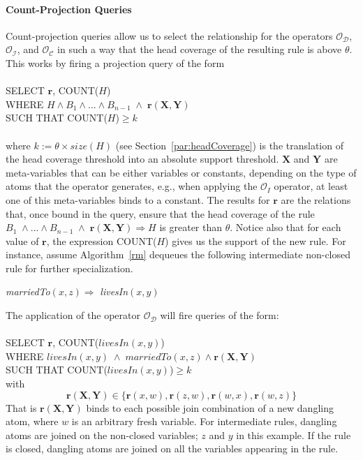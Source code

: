 {\paragraph{Count-Projection Queries} Count-projection queries allow us to select the relationship for the operators 
$\mathcal{O_D}$, $\mathcal{O_I}$, and $\mathcal{O_C}$ in such a way
that the head coverage of the resulting rule is above $\theta$.
This works by firing a projection query of the form
\\ \\
SELECT $\bm{r}$, COUNT($H$)\\
WHERE $H \wedge B_1 \wedge ... \wedge B_{n-1}\; \wedge\; \bm{r}(\bm{X},\bm{Y})$\\
SUCH THAT COUNT($H$)$\geq k$
\\ \\
where $k := \theta \times size(H)$ (see Section~\ref{par:headCoverage}) is the translation of the
head coverage threshold into an absolute support threshold. $\bm{X}$ and $\bm{Y}$ are meta-variables that
can be either variables or constants, 
depending on the type of atoms that the operator generates, e.g., when applying the $\mathcal{O}_I$ operator, 
at least one of this meta-variables binds to a constant.
The results for $\bm{r}$ are the relations that, once bound in the query, ensure that the head coverage 
of the rule $B_1 \; \wedge ... \wedge B_{n-1} \;\wedge\; \bm{r}(\bm{X},\bm{Y}) \Rightarrow H$ is greater than $\theta$.
Notice also that for each value of $\bm{r}$, the expression COUNT($H$) gives us the support of the new rule.
For instance, assume Algorithm~\ref{rm} dequeues the following intermediate non-closed rule for further specialization.

\begin{center}
\emph{marriedTo}$(x,z) \Rightarrow $ \emph{livesIn}$(x,y)$
\end{center}

\noindent
The application of the operator $\mathcal{O_D}$ will fire queries of the form:\\ \\
SELECT $\bm{r}$, COUNT($livesIn(x,y)$) \\
WHERE $livesIn(x,y) \; \wedge \; marriedTo(x,z) \wedge \bm{r}(\bm{X}, \bm{Y})$\\
SUCH THAT COUNT($livesIn(x,y)$)$\ge k$\\

\noindent with 
\[
\bm{r}(\bm{X}, \bm{Y}) \in \{\bm{r}(x,w), \bm{r}(z,w), \bm{r}(w,x), \bm{r}(w,z) \}
\]
That is $\bm{r}(\bm{X}, \bm{Y})$ binds to each possible join combination of a new dangling atom,
where $w$ is an arbitrary fresh variable. For intermediate rules, dangling atoms are joined on the non-closed variables; 
$z$ and $y$ in this example.
If the rule is closed, dangling atoms are joined on all the variables appearing in the rule.

}
